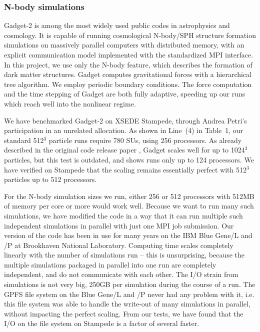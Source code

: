 \documentclass[10pt, preprint]{aastex}
\begin{document}
\subsubsection{N-body simulations}

Gadget-2 is among the most widely used public codes in astrophysics
and cosmology.  It is capable of running cosmological N-body/SPH
structure formation simulations on massively parallel computers with
distributed memory, with an explicit communication model implemented
with the standardized MPI interface.  In this project, we use only the
N-body feature, which describes the formation of dark matter
structures.  Gadget computes gravitational forces with a hierarchical
tree algorithm.  We employ periodic boundary conditions.  The force
computation and the time stepping of Gadget are both fully adaptive,
speeding up our runs which reach well into the nonlinear regime.

We have benchmarked Gadget-2 on XSEDE Stampede, through Andrea Petri's
participation in an unrelated allocation.
As shown in Line~(4) in Table~1, our standard 512$^3$ particle runs
require 780 SUs, using 256 processors.  As already described in the
original code release paper \cite{VS05}, Gadget scales well for up to
1024$^3$ particles, but this test is outdated, and shows runs only up
to 124 processors.  We have verified on Stampede that the scaling
remains essentially perfect with 512$^3$ particles up to 512
processors.

For the N-body simulation sizes we run, either 256 or 512 processors
with 512MB of memory per core or more would work well. Because we want
to run many such simulations, we have modified the code in a way that
it can run multiple such independent simulations in parallel with just
one MPI job submission. Our version of the code has been in use for
many years on the IBM Blue Gene/L and /P at Brookhaven National
Laboratory.  Computing time scales completely linearly with the number
of simulations run -- this is unsurprising, because the multiple
simulations packaged in parallel into one run are completely
independent, and do not communicate with each other.  The I/O strain
from simulations is not very big, 250GB per simulation during the
course of a run. The GPFS file system on the Blue Gene/L and /P never
had any problem with it, i.e. this file system was able to handle the
write-out of many simulations in parallel, without impacting the
perfect scaling.  From our tests, we have found that the I/O on the
file system on Stampede is a factor of several faster.
\end{document}

